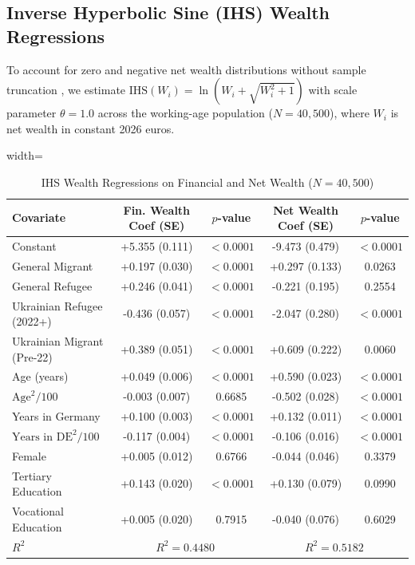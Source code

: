 \documentclass[conference]{IEEEtran}
\begin{document}
\subsection{Inverse Hyperbolic Sine (IHS) Wealth Regressions}
To account for zero and negative net wealth distributions without sample truncation \cite{burbidge1988ihs}, we estimate $\text{IHS}(W_i) = \ln( W_i + \sqrt{W_i^2 + 1} )$ with scale parameter $\theta = 1.0$ across the working-age population ($N = 40,500$), where $W_i$ is net wealth in constant 2026 euros.

\begin{table}[htbp]
\caption{IHS Wealth Regressions on Financial and Net Wealth ($N = 40,500$)}
\centering
\begin{adjustbox}{width=\columnwidth}
\begin{tabular}{lcccc}
\toprule
\textbf{Covariate} & \textbf{Fin. Wealth Coef (SE)} & \textbf{$p$-value} & \textbf{Net Wealth Coef (SE)} & \textbf{$p$-value} \\
\midrule
Constant & +5.355 (0.111) & $<0.0001$ & -9.473 (0.479) & $<0.0001$ \\
General Migrant & +0.197 (0.030) & $<0.0001$ & +0.297 (0.133) & 0.0263 \\
General Refugee & +0.246 (0.041) & $<0.0001$ & -0.221 (0.195) & 0.2554 \\
Ukrainian Refugee (2022+) & -0.436 (0.057) & $<0.0001$ & -2.047 (0.280) & $<0.0001$ \\
Ukrainian Migrant (Pre-22) & +0.389 (0.051) & $<0.0001$ & +0.609 (0.222) & 0.0060 \\
Age (years) & +0.049 (0.006) & $<0.0001$ & +0.590 (0.023) & $<0.0001$ \\
$\text{Age}^2 / 100$ & -0.003 (0.007) & 0.6685 & -0.502 (0.028) & $<0.0001$ \\
Years in Germany & +0.100 (0.003) & $<0.0001$ & +0.132 (0.011) & $<0.0001$ \\
$\text{Years in DE}^2 / 100$ & -0.117 (0.004) & $<0.0001$ & -0.106 (0.016) & $<0.0001$ \\
Female & +0.005 (0.012) & 0.6766 & -0.044 (0.046) & 0.3379 \\
Tertiary Education & +0.143 (0.020) & $<0.0001$ & +0.130 (0.079) & 0.0990 \\
Vocational Education & +0.005 (0.020) & 0.7915 & -0.040 (0.076) & 0.6029 \\
\midrule
$R^2$ & \multicolumn{2}{c}{$R^2 = 0.4480$} & \multicolumn{2}{c}{$R^2 = 0.5182$} \\
\bottomrule
\end{tabular}
\end{adjustbox}
\label{tab:ihs_wealth}
\end{table}
\end{document}
